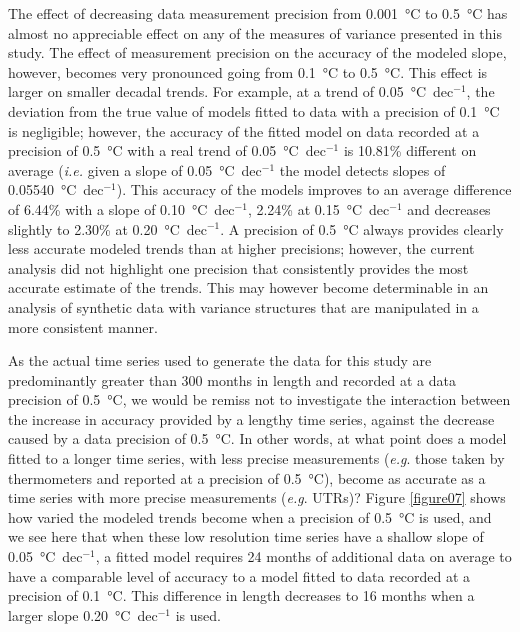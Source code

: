 \documentclass[]{ametsoc}
\begin{document}
The effect of decreasing data measurement precision from \SI{0.001}{\degreeCelsius} to \SI{0.5}{\degreeCelsius} has almost no appreciable effect on any of the measures of variance presented in this study. The effect of measurement precision on the accuracy of the modeled slope, however, becomes very pronounced going from \SI{0.1}{\degreeCelsius} to \SI{0.5}{\degreeCelsius}. This effect is larger on smaller decadal trends. For example, at a trend of \SI{0.05}{\degreeCelsius}~dec$^{-1}$, the deviation from the true value of models fitted to data with a precision of \SI{0.1}{\degreeCelsius} is negligible; however, the accuracy of the fitted model on data recorded at a precision of \SI{0.5}{\degreeCelsius} with a real trend of \SI{0.05}{\degreeCelsius}~dec$^{-1}$ is 10.81\% different on average (\emph{i.e.} given a slope of \SI{0.05}{\degreeCelsius}~dec$^{-1}$ the model detects slopes of \SI{0.05540}{\degreeCelsius}~dec$^{-1}$). This accuracy of the models improves to an average difference of 6.44\% with a slope of \SI{0.10}{\degreeCelsius}~dec$^{-1}$, 2.24\% at \SI{0.15}{\degreeCelsius}~dec$^{-1}$ and decreases slightly to 2.30\% at \SI{0.20}{\degreeCelsius}~dec$^{-1}$. A precision of \SI{0.5}{\degreeCelsius} always provides clearly less accurate modeled trends than at higher precisions; however, the current analysis did not highlight one precision that consistently provides the most accurate estimate of the trends. This may however become determinable in an analysis of synthetic data with variance structures that are manipulated in a more consistent manner.

As the actual time series used to generate the data for this study are predominantly greater than 300 months in length and recorded at a data precision of \SI{0.5}{\degreeCelsius}, we would be remiss not to investigate the interaction between the increase in accuracy provided by a lengthy time series, against the decrease caused by a data precision of \SI{0.5}{\degreeCelsius}. In other words, at what point does a model fitted to a longer time series, with less precise measurements (\emph{e.g}. those taken by thermometers and reported at a precision of \SI{0.5}{\degreeCelsius}), become as accurate as a time series with more precise measurements (\emph{e.g}. UTRs)? Figure \ref{figure07} shows how varied the modeled trends become when a precision of \SI{0.5}{\degreeCelsius} is used, and we see here that when these low resolution time series have a shallow slope of \SI{0.05}{\degreeCelsius}~dec$^{-1}$, a fitted model requires 24 months of additional data on average to have a comparable level of accuracy to a model fitted to data recorded at a precision of \SI{0.1}{\degreeCelsius}. This difference in length decreases to 16 months when a larger slope \SI{0.20}{\degreeCelsius}~dec$^{-1}$ is used.
\end{document}
